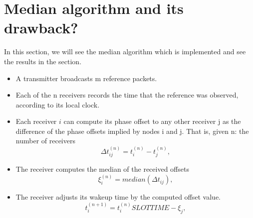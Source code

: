 \documentclass[a4paper,8pt]{report}
\begin{document}
\section{Median algorithm and its drawback?} In this section, we
will see the median algorithm which is implemented and see the
results in the section.
\begin{itemize}
\item A transmitter broadcasts m reference packets.
\item Each of the n receivers records the time that the reference was observed,
according to its local clock.
\item Each receiver $i$ can compute its phase offset to
any other receiver j as the difference of the phase offsets implied
by nodes i and j. That is, given
\newline n: the number of receivers
\begin{equation}
\Delta t_{ij}^{(n)} = t_i^{(n)} - t_j^{(n)} ,
\end{equation}
\item The receiver computes the median of the received offsets
\begin{equation}
\xi_i^{(n)} = median(\Delta t_{ij}) ,
\end{equation}
\item The receiver adjusts its wakeup time by the computed offset
value.
\begin{equation}
t_{i}^{(n+1)} = t_i^{(n)} SLOTTIME - \xi_j ,
\end{equation}
\end{itemize}
\end{document}
